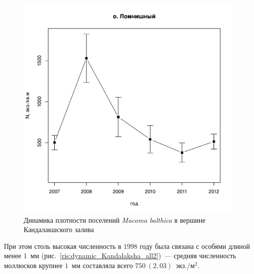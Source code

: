 \begin{figure}[p]
\begin{minipage}[b]{.49\linewidth}
\begin{center}
		\includegraphics[width=\linewidth]{../White_Sea/Lomnishniy/N_dynamic1.pdf}
	\end{center}
	\end{minipage}



	\caption{Динамика плотности поселений {\it Macoma balthica} в вершине Кандалакшского залива}
	\label{ris:dynamic_Kandalaksha_all}
	\end{figure}
При этом столь высокая численность в $1998$ году была связана с особями длиной менее $1$~мм (рис.~\ref{ris:dynamic_Kandalaksha_all2})~--- средняя численность моллюсков крупнее $1$~мм составляла всего $750~(2,03)$~экз./м$^2$.
